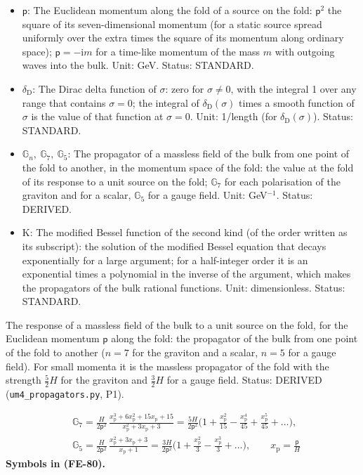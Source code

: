 \documentclass[
  10pt,
]{article}
\begin{document}
\begin{itemize}
  Unit: dimensionless (a relative amplitude); length in a propagator.
  Status: DERIVED.
\item
  \(\mathsf{p}\): The Euclidean momentum along the fold of a source on
  the fold: \(\mathsf{p}^2\) the square of its seven-dimensional
  momentum (for a static source spread uniformly over the extra times
  the square of its momentum along ordinary space);
  \(\mathsf{p} = -\mathrm{i}m\) for a time-like momentum of the mass
  \(m\) with outgoing waves into the bulk. Unit: GeV. Status: STANDARD.
\item
  \(\delta_{\mathrm{D}}\): The Dirac delta function of \(\sigma\): zero
  for \(\sigma \ne 0\), with the integral 1 over any range that contains
  \(\sigma = 0\); the integral of \(\delta_{\mathrm{D}}(\sigma)\) times
  a smooth function of \(\sigma\) is the value of that function at
  \(\sigma = 0\). Unit: 1/length (for \(\delta_{\mathrm{D}}(\sigma)\)).
  Status: STANDARD.
\item
  \(\mathbb{G}_n,\ \mathbb{G}_7,\ \mathbb{G}_5\): The propagator of a
  massless field of the bulk from one point of the fold to another, in
  the momentum space of the fold: the value at the fold of its response
  to a unit source on the fold; \(\mathbb{G}_7\) for each polarisation
  of the graviton and for a scalar, \(\mathbb{G}_5\) for a gauge field.
  Unit: GeV\(^{-1}\). Status: DERIVED.
\item
  \(\mathrm{K}\): The modified Bessel function of the second kind (of
  the order written as its subscript): the solution of the modified
  Bessel equation that decays exponentially for a large argument; for a
  half-integer order it is an exponential times a polynomial in the
  inverse of the argument, which makes the propagators of the bulk
  rational functions. Unit: dimensionless. Status: STANDARD.
\end{itemize}

The response of a massless field of the bulk to a unit source on the
fold, for the Euclidean momentum \(\mathsf{p}\) along the fold: the
propagator of the bulk from one point of the fold to another (\(n = 7\)
for the graviton and a scalar, \(n = 5\) for a gauge field). For small
momenta it is the massless propagator of the fold with the strength
\(\frac52H\) for the graviton and \(\frac32H\) for a gauge field.
Status: DERIVED (\texttt{um4\_propagators.py}, P1).

\[
\begin{aligned}
&\mathbb{G}_7 = \frac{H}{2\mathsf{p}^2}\,\frac{x_{\mathrm{p}}^3 + 6x_{\mathrm{p}}^2 + 15x_{\mathrm{p}} + 15}{x_{\mathrm{p}}^2 + 3x_{\mathrm{p}} + 3}
 = \frac{5H}{2\mathsf{p}^2}\Big(1 + \frac{x_{\mathrm{p}}^2}{15} - \frac{x_{\mathrm{p}}^4}{45} + \frac{x_{\mathrm{p}}^5}{45} + \dots\Big),\\
&\mathbb{G}_5 = \frac{H}{2\mathsf{p}^2}\,\frac{x_{\mathrm{p}}^2 + 3x_{\mathrm{p}} + 3}{x_{\mathrm{p}} + 1}
 = \frac{3H}{2\mathsf{p}^2}\Big(1 + \frac{x_{\mathrm{p}}^2}{3} - \frac{x_{\mathrm{p}}^3}{3} + \dots\Big),\qquad x_{\mathrm{p}} = \frac{\mathsf{p}}{H}
\end{aligned} \tag{FE-80}
\] \textbf{Symbols in (FE-80).}
\end{document}
